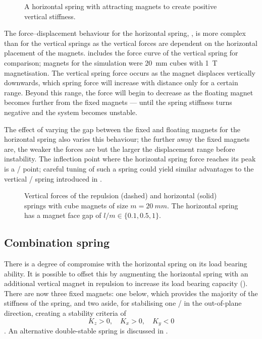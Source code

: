 \documentclass[11pt,a4paper]{memoir}
\begin{document}
\begin{figure}
  \caption[`Horizontal' attraction magnetic spring.]{A horizontal spring with attracting magnets to create positive vertical stiffness.}
\end{figure}

The force--displacement behaviour for the horizontal spring, , is more complex than for the vertical springs as the vertical forces are dependent on the horizontal placement of the magnets.
 includes the force curve of the vertical spring for comparison; magnets for the simulation were \SI{20}{mm} cubes with \SI{1}{T} magnetisation.
The vertical spring force occurs as the magnet displaces vertically downwards, which spring force will increase with distance only for a certain range.
Beyond this range, the force will begin to decrease as the floating magnet becomes further from the fixed magnets — until the spring stiffness turns negative and the system becomes unstable.

The effect of varying the gap between the fixed and floating magnets for the horizontal spring also varies this behaviour; the further away the fixed magnets are, the weaker the forces are but the larger the displacement range before instability.
The inflection point where the horizontal spring force reaches its peak is a \qzs/ point; careful tuning of such a spring could yield similar advantages to the vertical \qzs/ spring introduced in .

\begin{figure}
  \caption[Spring forces of the repulsion \& horizontal springs.]{
    Vertical forces of the repulsion (dashed) and horizontal (solid) springs with cube magnets of size $m=\SI{20}{mm}$. The horizontal spring has a magnet face gap of $l/m\in\{0.1,0.5,1\}$.
  }
\end{figure}


\subsection{Combination spring}

There is a degree of compromise with the horizontal spring on its load bearing ability.
It is possible to offset this by augmenting the horizontal spring with an additional vertical magnet in repulsion to increase its load bearing capacity ().
There are now three fixed magnets: one below, which provides the majority of the stiffness of the spring, and two aside, for stabilising one \dof/ in the out-of-plane direction, creating a stability criteria of
\begin{dmath}[compact]
K_z>0,\quad K_x>0,\quad K_y<0
\end{dmath}.
An alternative double-stable spring is discussed in .
\end{document}
